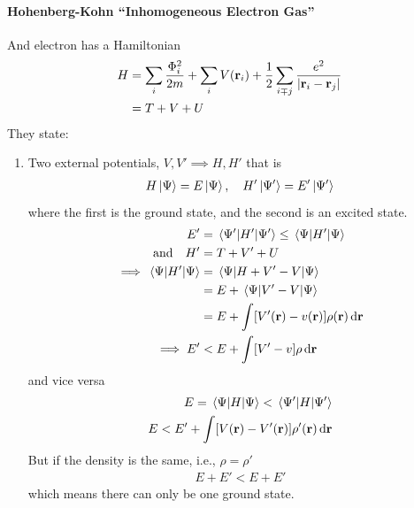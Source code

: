 \documentclass[../main.tex]{subfiles}
\begin{document}
\paragraph*{Hohenberg-Kohn ``Inhomogeneous Electron Gas''}
And electron has a Hamiltonian
\begin{align*}
    H &= \sum_i \frac{\Phi_i^2}{2m} + \sum_i V(\vb r_i) 
        + \frac{1}{2} \sum_{i \mp j} \frac{e^2}{\abs{\vb r_i - \vb r_j}} \\
        &= T + V + U
\end{align*}
They state:
\begin{enumerate}
    \item Two external potentials, $V, V' \implies H, H'$ that is
    \begin{align*}
        H \ket{\Psi} = E \ket{\Psi}, \quad H' \ket{\Psi'} = E' \ket{\Psi'}
    \end{align*}
    where the first is the ground state, and the second is an excited state.
    \begin{align*}
        E' &= \ev{H'}{\Psi'} \leq \ev{H'}{\Psi} \\
        \qand H'&= T + V' + U \\
        \implies \ev{H'}{\Psi} &= \ev{H + V' - V}{\Psi} \\
        &= E + \ev{V' - V}{\Psi} \\
        &= E + \int[V' (\vb r) - v(\vb r)] \rho(\vb r) \dd{\vb r} \\
        \implies E' &< E + \int[V' - v] \rho \dd{\vb r} 
    \end{align*}
    and vice versa
    \begin{align*}
        E = \ev{H}{\Psi} < \ev{H}{\Psi'} \\
        E < E' + \int[V(\vb r) - V'(\vb r)] \rho'(\vb r) \dd{\vb r}
    \end{align*}
    But if the density is the same, i.e., $\rho = \rho'$
    \begin{align*}
        E + E' < E + E'
    \end{align*}
    which means there can only be one ground state.
\end{enumerate}
\end{document}
